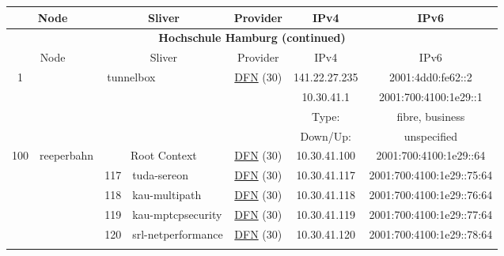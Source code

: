 \begin{small}
\begin{center}
\begin{longtable}{|c|c|c|c|c|c|c|c|}
 \multicolumn{2}{|p{8em}|}{Node} & \multicolumn{2}{|p{8em}|}{Sliver} & \multicolumn{2}{|p{8em}|}{Provider} & IPv4 & IPv6 \\ \hline
\endfirsthead
\hline
 \multicolumn{8}{|c|}{\textbf{Hochschule Hamburg (continued)}} \\ \hline
 \multicolumn{2}{|p{8em}|}{Node} & \multicolumn{2}{|p{8em}|}{Sliver} & \multicolumn{2}{|p{8em}|}{Provider} & IPv4 & IPv6 \\ \hline
\endhead
 \multirow{4}{*}{\tiny{1}} & \multicolumn{3}{|c|}{\multirow{4}{*}{\tiny{tunnelbox}}} & \multicolumn{2}{|c|}{\multirow{4}{*}{\tiny{\href{https://www.dfn.de}{DFN} (30)}}} & \tiny{141.22.27.235} & \tiny{2001:4dd0:fe62::2} \\* \cline{7-7}\cline{8-8}
  & \multicolumn{3}{|c|}{} & \multicolumn{2}{|c|}{} & \tiny{10.30.41.1} & \tiny{2001:700:4100:1e29::1} \\* \cline{7-7}\cline{8-8}
  & \multicolumn{3}{|c|}{} & \multicolumn{2}{|c|}{} & Type: & fibre, business \\* \cline{7-7}\cline{8-8}
  & \multicolumn{3}{|c|}{} & \multicolumn{2}{|c|}{} & Down/Up:  & unspecified \\ \hline
 \multirow{22}{*}{\tiny{100}} & \multicolumn{1}{|l|}{\multirow{22}{*}{\tiny{reeperbahn}}} & \multicolumn{2}{|c|}{\tiny{Root Context}} & \multicolumn{2}{|c|}{\tiny{\href{https://www.dfn.de}{DFN} (30)}} & \tiny{10.30.41.100} & \tiny{2001:700:4100:1e29::64} \\* \cline{3-3}\cline{4-4}\cline{5-5}\cline{6-6}\cline{7-7}\cline{8-8}
  &  & \tiny{117} & \multicolumn{1}{|l|}{\tiny{tuda-sereon}} & \multicolumn{2}{|c|}{\tiny{\href{https://www.dfn.de}{DFN} (30)}} & \tiny{10.30.41.117} & \tiny{2001:700:4100:1e29::75:64} \\* \cline{3-3}\cline{4-4}\cline{5-5}\cline{6-6}\cline{7-7}\cline{8-8}
  &  & \tiny{118} & \multicolumn{1}{|l|}{\tiny{kau-multipath}} & \multicolumn{2}{|c|}{\tiny{\href{https://www.dfn.de}{DFN} (30)}} & \tiny{10.30.41.118} & \tiny{2001:700:4100:1e29::76:64} \\* \cline{3-3}\cline{4-4}\cline{5-5}\cline{6-6}\cline{7-7}\cline{8-8}
  &  & \tiny{119} & \multicolumn{1}{|l|}{\tiny{kau-mptcpsecurity}} & \multicolumn{2}{|c|}{\tiny{\href{https://www.dfn.de}{DFN} (30)}} & \tiny{10.30.41.119} & \tiny{2001:700:4100:1e29::77:64} \\* \cline{3-3}\cline{4-4}\cline{5-5}\cline{6-6}\cline{7-7}\cline{8-8}
  &  & \tiny{120} & \multicolumn{1}{|l|}{\tiny{srl-netperformance}} & \multicolumn{2}{|c|}{\tiny{\href{https://www.dfn.de}{DFN} (30)}} & \tiny{10.30.41.120} & \tiny{2001:700:4100:1e29::78:64} \\* \cline{3-3}\cline{4-4}\cline{5-5}\cline{6-6}\cline{7-7}\cline{8-8}

\end{longtable}
\end{center}
\end{small}
